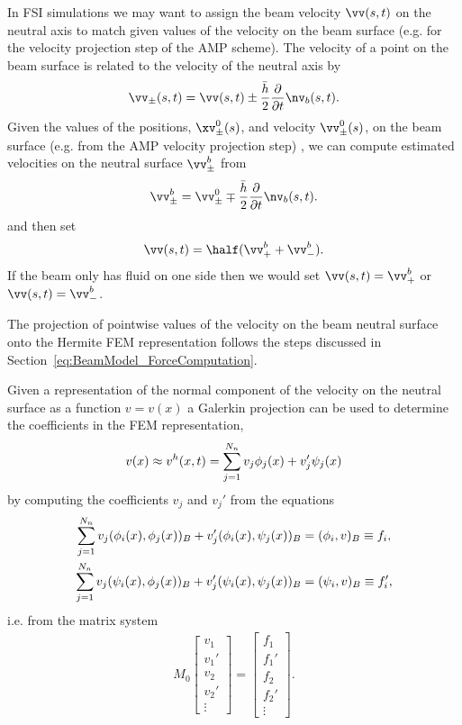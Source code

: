 \documentclass[11pt]{article}
\newcommand{\hs}{\bar{h}}
\newcommand{\nsv}{\nv_b}
\begin{document}
In FSI simulations we may want to assign the beam velocity $\vv(s,t)$ on the neutral axis to match
given values of the velocity on the beam surface (e.g. for the velocity projection step of the AMP scheme). 
%
The velocity of a point on the beam surface is related to the velocity of the neutral axis by
\begin{align}
   \vv_\pm(s,t) =  \vv(s,t) \pm \frac{\hs}{2} \frac{\partial}{\partial t}\nsv(s,t).
\end{align}
Given the values of the positions, $\xv_\pm^0(s)$, and velocity $\vv_\pm^0(s)$, 
on the beam surface (e.g. from the AMP velocity projection step) , we can compute estimated velocities on the neutral
surface $\vv_\pm^b$ from
\begin{align}
   \vv_\pm^b   = \vv_\pm^0 \mp \frac{\hs}{2} \frac{\partial}{\partial t}\nsv(s,t).
\end{align}
and then set
\begin{align}
   \vv(s,t)   = \half( \vv_+^b + \vv_-^b ). 
\end{align}
If the beam only has fluid on one side then we would set $\vv(s,t)=\vv_+^b$ or $\vv(s,t)=\vv_-^b$.

The projection of pointwise values of the velocity on the beam neutral surface
onto the Hermite FEM representation follows the steps discussed in Section~\ref{eq:BeamModel_ForceComputation}.

Given a representation of the normal component of the 
velocity on the neutral surface as a function $v=v(x)$ a Galerkin projection can be used to determine the
coefficients in the FEM representation,
\begin{align}
  v(x) \approx v^h(x,t) = \sum_{j=1}^{N_n} v_j \phi_j(x) + v_j' \psi_j(x) 
\end{align}
by computing the coefficients $v_j$ and $v_j'$ from the equations 
\begin{align}
  \sum_{j=1}^{N_n} v_j (\phi_i(x),\phi_j(x))_B + v_j' (\phi_i(x),\psi_j(x))_B &= (\phi_i,v)_B \equiv f_i , \\
  \sum_{j=1}^{N_n} v_j (\psi_i(x),\phi_j(x))_B + v_j' (\psi_i(x),\psi_j(x))_B &=  (\psi_i,v)_B  \equiv f_i',
\end{align}
i.e. from the matrix system
\begin{align}
   M_0 \begin{bmatrix} v_1 \\ v_1' \\ v_2 \\ v_2' \\ \vdots \end{bmatrix}
       =  \begin{bmatrix} f_1 \\ f_1' \\ f_2 \\ f_2' \\ \vdots \end{bmatrix} .
\end{align}
\end{document}
